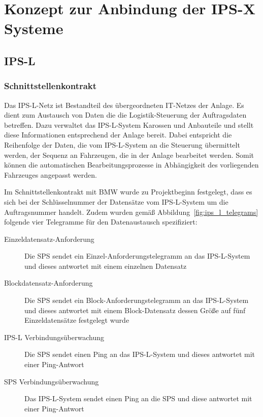 

\chapter{Konzept zur Anbindung der IPS-X Systeme}
\label{chap:interfaces}

\section{IPS-L}
\label{sec:ips_l}

\subsection{Schnittstellenkontrakt}
\label{subsec:ips_l_contract}

Das IPS-L-Netz ist Bestandteil des übergeordneten IT-Netzes der Anlage. Es dient zum Austausch von Daten die die Logistik-Steuerung der Auftragsdaten betreffen. Dazu verwaltet das IPS-L-System Karossen und Anbauteile und stellt diese Informationen entsprechend der Anlage bereit. Dabei entspricht die Reihenfolge der Daten, die vom IPS-L-System an die Steuerung übermittelt werden, der Sequenz an Fahrzeugen, die in der Anlage bearbeitet werden. Somit können die automatischen Bearbeitungsprozesse in Abhängigkeit des vorliegenden Fahrzeuges angepasst werden.

Im Schnittstellenkontrakt mit BMW wurde zu Projektbeginn festgelegt, dass es sich bei der Schlüsselnummer der Datensätze vom IPS-L-System um die Auftragsnummer handelt. Zudem wurden gemäß Abbildung~\ref{fig:ips_l_telegrams} folgende vier Telegramme für den Datenaustausch spezifiziert:

\begin{description}
    \item [Einzeldatensatz-Anforderung] Die SPS sendet ein Einzel-Anforderungstelegramm an das IPS-L-System und dieses antwortet mit einem einzelnen Datensatz
    \item [Blockdatensatz-Anforderung] Die SPS sendet ein Block-Anforderungstelegramm an das IPS-L-System und dieses antwortet mit einem Block-Datensatz dessen Größe auf fünf Einzeldatensätze festgelegt wurde
    \item [IPS-L Verbindungsüberwachung] Die SPS sendet einen Ping an das IPS-L-System und dieses antwortet mit einer Ping-Antwort
    \item [SPS Verbindungsüberwachung] Das IPS-L-System sendet einen Ping an die SPS und diese antwortet mit einer Ping-Antwort
\end{description}

